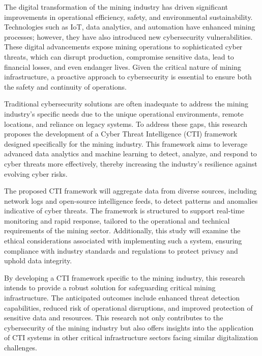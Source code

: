 \documentclass[a4paper,twoside,12pt]{report}
\begin{document}
The digital transformation of the mining industry has driven significant improvements in operational efficiency, safety, and environmental sustainability. Technologies such as IoT, data analytics, and automation have enhanced mining processes; however, they have also introduced new cybersecurity vulnerabilities. These digital advancements expose mining operations to sophisticated cyber threats, which can disrupt production, compromise sensitive data, lead to financial losses, and even endanger lives. Given the critical nature of mining infrastructure, a proactive approach to cybersecurity is essential to ensure both the safety and continuity of operations.

Traditional cybersecurity solutions are often inadequate to address the mining industry’s specific needs due to the unique operational environments, remote locations, and reliance on legacy systems. To address these gaps, this research proposes the development of a Cyber Threat Intelligence (CTI) framework designed specifically for the mining industry. This framework aims to leverage advanced data analytics and machine learning to detect, analyze, and respond to cyber threats more effectively, thereby increasing the industry’s resilience against evolving cyber risks.

The proposed CTI framework will aggregate data from diverse sources, including network logs and open-source intelligence feeds, to detect patterns and anomalies indicative of cyber threats. The framework is structured to support real-time monitoring and rapid response, tailored to the operational and technical requirements of the mining sector. Additionally, this study will examine the ethical considerations associated with implementing such a system, ensuring compliance with industry standards and regulations to protect privacy and uphold data integrity.

By developing a CTI framework specific to the mining industry, this research intends to provide a robust solution for safeguarding critical mining infrastructure. The anticipated outcomes include enhanced threat detection capabilities, reduced risk of operational disruptions, and improved protection of sensitive data and resources. This research not only contributes to the cybersecurity of the mining industry but also offers insights into the application of CTI systems in other critical infrastructure sectors facing similar digitalization challenges.
\end{document}
